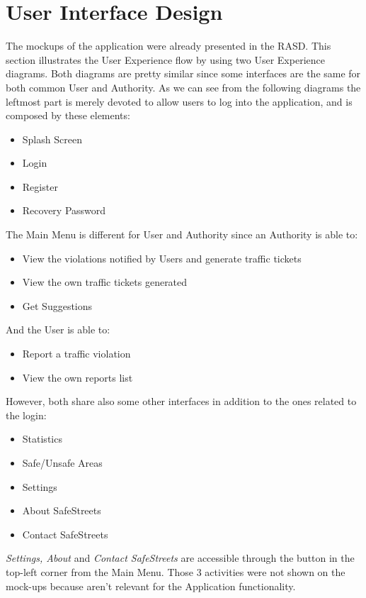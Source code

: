 \section{User Interface Design}
  The mockups of the application were already presented in the RASD. This section illustrates the User Experience flow by using two User Experience diagrams. Both diagrams are pretty similar since some interfaces are the same for both common User and Authority. As we can see from the following diagrams the leftmost part is merely devoted to allow users to log into the application, and is composed by these elements:
\begin{itemize}
    \item Splash Screen
    \item Login
    \item Register
    \item Recovery Password
\end{itemize}

\vspace{4mm}
The Main Menu is different for User and Authority since an Authority is able to:
\begin{itemize}
\item View the violations notified by Users and generate traffic tickets
\item View the own traffic tickets generated
\item Get Suggestions
\end{itemize}
And the User is able to:
\begin{itemize}
\item Report a traffic violation
\item View the own reports list
\end{itemize}
However, both share also some other interfaces in addition to the ones related to the login:
\begin{itemize}
    \item Statistics
    \item Safe/Unsafe Areas
    \item Settings
    \item About SafeStreets
    \item Contact SafeStreets
\end{itemize}
\textit{Settings, About} and \textit{Contact SafeStreets} are accessible through the button in the top-left corner from the Main Menu. Those 3 activities were not shown on the mock-ups because aren't relevant for the Application functionality.

